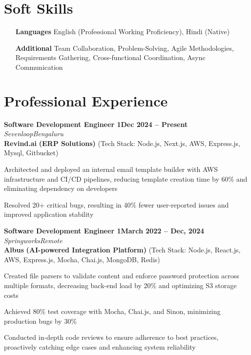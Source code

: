 \documentclass[letterpaper, 10pt]{article}
\newcommand{\heading}[2]{ \hspace{6pt}#1\hfill#2\\[0.8pt] }
\newcommand{\headingBf}[2]{ \heading{\textbf{#1}}{\textbf{#2}} }
\newcommand{\headingIt}[2]{ \heading{\textit{#1}}{\textit{#2}} }
\newenvironment{resume_list}{
\vspace{-5pt}
\begin{itemize}[itemsep=-3pt, parsep=0.2pt, leftmargin=20pt] }{ \end{itemize}
\vspace{-4pt}
}
\begin{document}
	\section{Soft Skills}
	\begin{itemize}[itemsep=-2pt, parsep=0.5pt, leftmargin=70pt]
		\item[\textbf{Languages}] English (Professional Working Proficiency), Hindi
			(Native)

		\item[\textbf{Additional}] Team Collaboration, Problem-Solving, Agile Methodologies,
			Requirements Gathering, Cross-functional Coordination, Async Communication
	\end{itemize}

	\section{Professional Experience}
		\headingBf{Software Development Engineer 1}{Dec 2024 -- Present}
	\vspace{1pt}
	\headingIt{Sevenloop}{Bengaluru}
	\vspace{2pt}
	\hspace{10pt}\textbf{Revind.ai} \textbf{(ERP Solutions)} \small{(Tech Stack: Node.js, Next.js, AWS, Express.js, Mysql, Gitbucket)}
	\vspace{1pt}
        \begin{resume_list}
		\item Architected and deployed an internal email template builder with AWS infrastructure and CI/CD pipelines, reducing template creation time by 60\% and eliminating dependency on developers
	\end{resume_list}
	\begin{resume_list}
		\item Resolved 20+ critical bugs, resulting in 40\% fewer user-reported issues and improved application stability
	\end{resume_list}

	\vspace{2pt}

	\headingBf{Software Development Engineer 1}{March 2022 -- Dec, 2024}
	\vspace{1pt}
	\headingIt{Springworks}{Remote}
	\vspace{2pt}
	\hspace{10pt}\textbf{Albus} \textbf{(AI-powered Integration Platform)} \small{(Tech Stack: Node.js, React.js, AWS, Express.js, Mocha, Chai.js, MongoDB, Redis)}
	\vspace{1pt}
	\begin{resume_list}
		\item Created file parsers to validate
		content and enforce password protection across multiple formats, decreasing
		back-end load by 20\% and optimizing S3 storage costs \item Achieved 80\%
		test coverage with Mocha, Chai.js, and Sinon, minimizing production bugs by 30\%
		\item Conducted in-depth code reviews to ensure adherence to best practices,
		proactively catching edge cases and enhancing system reliability
	\end{resume_list}
\end{document}

